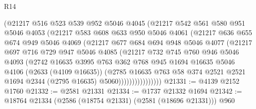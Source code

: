 \begin{lexlean}{R14}
\begin{coremodule}
                  (@21217
                    @516
                    @523
                    @539
                    @952
                    @5046
                    @4045
                    (@21217
                      @542
                      @561
                      @580
                      @951
                      @5046
                      @4053
                      (@21217
                        @583
                        @608
                        @633
                        @950
                        @5046
                        @4061
                        (@21217
                          @636
                          @655
                          @674
                          @949
                          @5046
                          @4069
                          (@21217
                            @677
                            @684
                            @694
                            @948
                            @5046
                            @4077
                            (@21217
                              @697
                              @716
                              @729
                              @947
                              @5046
                              @4085
                              (@21217
                                @732
                                @745
                                @760
                                @946
                                @5046
                                @4093
                                (@2742
                                  @16635
                                  @3995
                                  @763
                                  @362
                                  @768
                                  @945
                                  @1694
                                  @16635
                                  @5046
                                  @4106
                                  (@2633 (@4109 @16635))
                                  (@2785
                                    @16635
                                    @763
                                    @58
                                    @374
                                    @2521
                                    @2521
                                    @1694
                                    @2344
                                    (@2795 @16635)
                                    @5060))))))))))))))))
@21331 := @4139 @2152 @1760
@21332 := @2581 @21331
@21334 := @1737 @21332 @1694
@21342 := @18764 @21334 (@2586 (@18754 @21331) (@2581 (@18696 @21331))) @960

\end{coremodule}
\end{lexlean}
